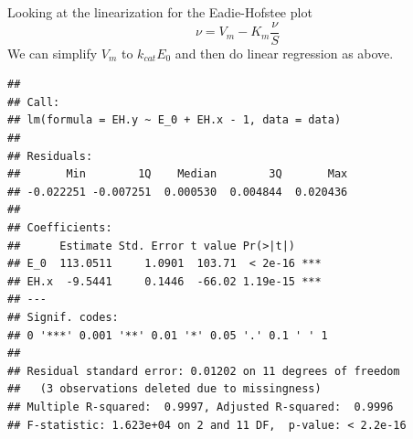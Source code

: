 \documentclass[
]{article}
\newenvironment{Shaded}{\begin{snugshade}}{\end{snugshade}}
\newcommand{\AttributeTok}[1]{\textcolor[rgb]{0.77,0.63,0.00}{#1}}
\newcommand{\DecValTok}[1]{\textcolor[rgb]{0.00,0.00,0.81}{#1}}
\newcommand{\FunctionTok}[1]{\textcolor[rgb]{0.00,0.00,0.00}{#1}}
\newcommand{\NormalTok}[1]{#1}
\newcommand{\OtherTok}[1]{\textcolor[rgb]{0.56,0.35,0.01}{#1}}
\newcommand{\SpecialCharTok}[1]{\textcolor[rgb]{0.00,0.00,0.00}{#1}}
\newcommand{\StringTok}[1]{\textcolor[rgb]{0.31,0.60,0.02}{#1}}
\begin{document}
Looking at the linearization for the Eadie-Hofstee plot
\[\nu = V_m - K_m \frac{\nu}{S}\]
We can simplify \(V_m\) to \(k_{cat}E_0\) and then do linear regression as above.

\begin{Shaded}
\end{Shaded}

\begin{verbatim}
## 
## Call:
## lm(formula = EH.y ~ E_0 + EH.x - 1, data = data)
## 
## Residuals:
##       Min        1Q    Median        3Q       Max 
## -0.022251 -0.007251  0.000530  0.004844  0.020436 
## 
## Coefficients:
##      Estimate Std. Error t value Pr(>|t|)    
## E_0  113.0511     1.0901  103.71  < 2e-16 ***
## EH.x  -9.5441     0.1446  -66.02 1.19e-15 ***
## ---
## Signif. codes:  
## 0 '***' 0.001 '**' 0.01 '*' 0.05 '.' 0.1 ' ' 1
## 
## Residual standard error: 0.01202 on 11 degrees of freedom
##   (3 observations deleted due to missingness)
## Multiple R-squared:  0.9997, Adjusted R-squared:  0.9996 
## F-statistic: 1.623e+04 on 2 and 11 DF,  p-value: < 2.2e-16
\end{verbatim}

\begin{Shaded}
\end{Shaded}
\end{document}
